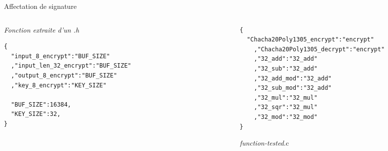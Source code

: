 \documentclass[A4,svgnames,9pt,aspectratio=169]{beamer}
\begin{document}
\begin{frame}[fragile]{Affectation de signature}

  \begin{columns}
    \begin{column}{0.4\textwidth}
        \textit{Fonction extraite d'un .h}
      \vspace{1cm} 
      \begin{lstlisting}[style=CStyle, caption={matching.json}]
{
  "input_8_encrypt":"BUF_SIZE"
  ,"input_len_32_encrypt":"BUF_SIZE"
  ,"output_8_encrypt":"BUF_SIZE"
  ,"key_8_encrypt":"KEY_SIZE"

  "BUF_SIZE":16384,
  "KEY_SIZE":32,
}
      \end{lstlisting}
    \end{column}
    \begin{column}{0.1\textwidth}
      
    \end{column}


    \begin{column}{0.5\textwidth}

      \begin{lstlisting}[style=CStyle, caption={twin.json}]
{
  "Chacha20Poly1305_encrypt":"encrypt"
    ,"Chacha20Poly1305_decrypt":"encrypt"
    ,"32_add":"32_add"
    ,"32_sub":"32_add"
    ,"32_add_mod":"32_add"
    ,"32_sub_mod":"32_add"
    ,"32_mul":"32_mul"
    ,"32_sqr":"32_mul"
    ,"32_mod":"32_mod"
}
      \end{lstlisting}
      \vspace{1cm}
      \large{\textit{function-tested}.c}
    \end{column}
  \end{columns}
\end{frame}
\end{document}
